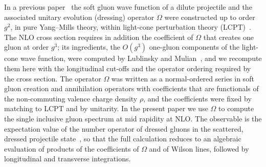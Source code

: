 In a previous paper~\cite{Radhakrishnan:2026soft} the soft gluon wave function of a dilute projectile and the associated unitary evolution (dressing) operator $\Omega$ were constructed up to order $g^2$, in pure Yang--Mills theory, within light-cone perturbation theory (LCPT)~\cite{Lepage:1980fj,Brodsky:1997de}. The NLO cross section requires in addition the coefficient of $\Omega$ that creates one gluon at order $g^3$; its ingredients, the $O(g^3)$ one-gluon components of the light-cone wave function, were computed by Lublinsky and Mulian~\cite{Lublinsky:2016meo}, and we recompute them here with the longitudinal cut-offs and the operator ordering required by the cross section. The operator $\Omega$ was written as a normal-ordered series in soft gluon creation and annihilation operators with coefficients that are functionals of the non-commuting valence charge density $\rho$, and the coefficients were fixed by matching to LCPT and by unitarity. In the present paper we use $\Omega$ to compute the single inclusive gluon spectrum at mid rapidity at NLO. The observable is the expectation value of the number operator of dressed gluons in the scattered, dressed projectile state~\cite{Kovner:2006wr}, so that the full calculation reduces to an algebraic evaluation of products of the coefficients of $\Omega$ and of Wilson lines, followed by longitudinal and transverse integrations.

